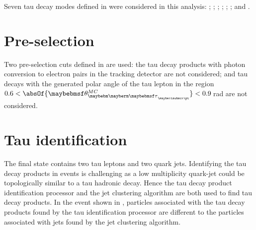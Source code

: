 Seven tau decay modes defined in  were considered in this analysis: \tauToElectron; \tauToMuon; \tauToPion; \tauToRho; \tauToAiPhoton; \tauToAiPion; and \tauToThreePion.


\section{Pre-selection}

Two pre-selection cuts defined in  are used: the tau decay products with photon conversion to electron pairs in the tracking detector are not considered; and tau decays with the generated polar angle of the tau lepton in the region $0.6 < \absOf{\theta_{\Ptau}^{MC}} < 0.9$\,rad are not considered.




\section{Tau identification}
\label{sec:tauHZfindTau}

The \eeZZQQ final state contains two tau leptons and two quark jets. Identifying the tau decay products in \eeZZQQ events is challenging as a low multiplicity quark-jet could be topologically similar  to a tau hadronic decay. Hence the tau decay product identification processor and the jet clustering algorithm are both used to find tau decay products. In the event shown in , particles associated with the tau decay products found by the tau identification processor are different to the particles associated with jets found by the jet clustering algorithm.


